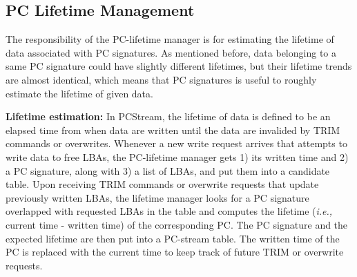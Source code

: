 

\subsection{PC Lifetime Management}
The responsibility of the PC-lifetime manager is for estimating the lifetime of
data associated with PC signatures. As mentioned before, data belonging to a
same PC signature could have slightly different lifetimes, but their lifetime
trends are almost identical, which means that PC signatures is useful to
roughly estimate the lifetime of given data.

\textbf{Lifetime estimation:}
In \textsf{PCStream}, the lifetime of data is defined to be an elapsed time
from when data are written until the data are invalided by TRIM commands or
overwrites. Whenever a new write request arrives that attempts to write data to
free LBAs, the PC-lifetime manager gets 1) its written time and 2) a PC
signature, along with 3) a list of LBAs, and put them into a candidate table.
Upon receiving TRIM commands or overwrite requests that update previously
written LBAs, the lifetime manager looks for a PC signature overlapped with
requested LBAs in the table and computes the lifetime (\textit{i.e.,} current
time - written time) of the corresponding PC.  The PC signature and the
expected lifetime are then put into a PC-stream table.  The written time of the
PC is replaced with the current time to keep track of future TRIM or overwrite
requests.  

